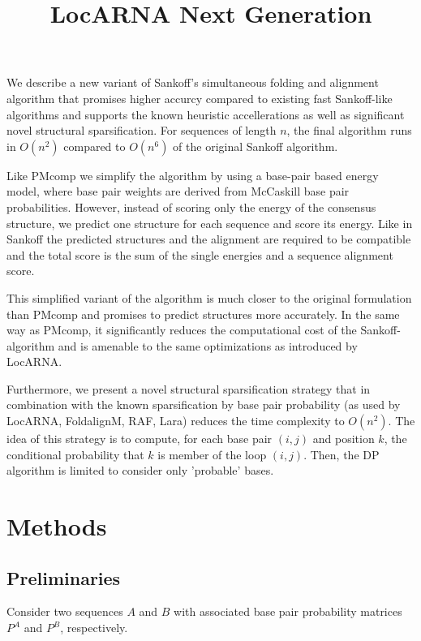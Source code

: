 \documentclass{article}
\title{LocARNA Next Generation}
\begin{document}
\maketitle

We describe a new variant of Sankoff's simultaneous folding and
alignment algorithm that promises higher accurcy compared to existing
fast Sankoff-like algorithms and supports the known heuristic
accellerations as well as significant novel structural
sparsification. For sequences of length $n$, the final algorithm runs
in $O(n^2)$ compared to $O(n^6)$ of the original Sankoff algorithm.

Like PMcomp we simplify the algorithm by using a base-pair based
energy model, where base pair weights are derived from McCaskill base
pair probabilities. However, instead of scoring only the energy of the
consensus structure, we predict one structure for each sequence and
score its energy. Like in Sankoff the predicted structures and the
alignment are required to be compatible and the total score is the sum
of the single energies and a sequence alignment score.
  
This simplified variant of the algorithm is much closer to the
original formulation than PMcomp and promises to predict structures
more accurately. In the same way as PMcomp, it significantly reduces
the computational cost of the Sankoff-algorithm and is amenable to the
same optimizations as introduced by LocARNA.

Furthermore, we present a novel structural sparsification strategy
that in combination with the known sparsification by base pair
probability (as used by LocARNA, FoldalignM, RAF, Lara) reduces the
time complexity to $O(n^2)$. The idea of this strategy is to compute,
for each base pair $(i,j)$ and position $k$, the conditional
probability that $k$ is member of the loop $(i,j)$. Then, the DP
algorithm is limited to consider only 'probable' bases.


\section{Methods}

\subsection{Preliminaries}

Consider two sequences $A$ and $B$ with associated base pair
probability matrices $P^A$ and $P^B$, respectively. 
\end{document}

